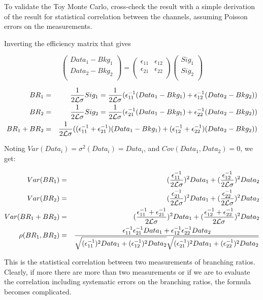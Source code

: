 \documentclass[12pt,a4paper,dvips]{article}
\begin{document}
To validate the Toy Monte Carlo, cross-check the result with a simple derivation of the result
for statistical correlation between the channels, assuming Poisson errors on the measurements.

Inverting the efficiency matrix that gives

\vspace*{-.5cm}

\begin{equation}
\left ( {\begin{array}{c}
Data_1 - Bkg_1 \\
Data_2 - Bkg_2 \\
 \end{array} } \right)
=
\left( {\begin{array}{cc}
 \epsilon_{11} & \epsilon_{12}  \\
 \epsilon_{21} & \epsilon_{22}  \\
 \end{array} } \right)
\left( {\begin{array}{c}
Sig_1\\
Sig_2\\
 \end{array} } \right)
\end{equation}

\vspace*{-1cm}

\begin{eqnarray}
BR_1 &=& \frac{1}{2\cal{L}\sigma}Sig_1 = \frac{1}{2\cal{L}\sigma}(\epsilon^{-1}_{11} (Data_1 - Bkg_1) + \epsilon^{-1}_{12} (Data_2 - Bkg_2))\\
BR_2 &=& \frac{1}{2\cal{L}\sigma}Sig_2 = \frac{1}{2\cal{L}\sigma}(\epsilon^{-1}_{21} (Data_1 - Bkg_1) + \epsilon^{-1}_{22} (Data_2 - Bkg_2)) \\
BR_1+BR_2 &=& \frac{1}{2\cal{L}\sigma}((\epsilon^{-1}_{11} + \epsilon^{-1}_{21}) (Data_1 - Bkg_1) + (\epsilon^{-1}_{12} + \epsilon^{-1}_{22}) (Data_2 - Bkg_2))
\end{eqnarray}

Noting $Var(Data_i) = \sigma^2(Data_i) = Data_i$, and $Cov(Data_1, Data_2) = 0$, we get:

\vspace*{-1cm}

\begin{eqnarray}
Var(BR_1) &=& (\frac{\epsilon^{-1}_{11}}{2\cal{L}\sigma})^2 Data_1 + (\frac{\epsilon^{-1}_{12}}{2\cal{L}\sigma})^2 Data_2\\
Var(BR_2) &=& (\frac{\epsilon^{-1}_{21}}{2\cal{L}\sigma})^2 Data_1 + (\frac{\epsilon^{-1}_{22}}{2\cal{L}\sigma})^2 Data_2\\
Var(BR_1+BR_2) &=& (\frac{\epsilon^{-1}_{11}+\epsilon^{-1}_{21}}{2\cal{L}\sigma})^2 Data_1 
                +  (\frac{\epsilon^{-1}_{12}+\epsilon^{-1}_{22}}{2\cal{L}\sigma})^2 Data_2\\
\rho(BR_1,BR_2) &=&  
\frac{\epsilon^{-1}_{11}\epsilon^{-1}_{21} Data_1 + \epsilon^{-1}_{12}\epsilon^{-1}_{22}Data_2}
{\sqrt{(\epsilon^{-1}_{11})^2 Data_1 + (\epsilon^{-1}_{12})^2 Data_2}
 \sqrt{(\epsilon^{-1}_{21})^2 Data_1 + (\epsilon^{-1}_{22})^2 Data_2}}
\end{eqnarray}

This is the statistical correlation between two measurements of branching ratios.
Clearly, if more there are more than two measurements or if we are to evaluate
the correlation including systematic errors on the branching ratios,
the formula becomes complicated.
\end{document}
